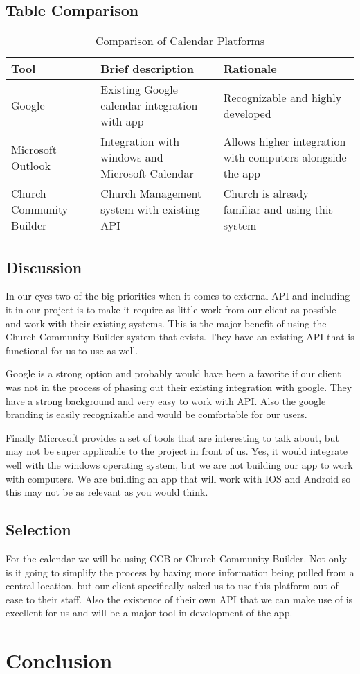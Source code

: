 \documentclass[letterpaper,10pt,draftclsnofoot,onecolumn,titlepage]{IEEEtran}
\begin{document}
	\subsection{Table Comparison}
	\begin{table}[ht]
	\caption{Comparison of Calendar Platforms}
	\begin{center}
	\begin{tabular} { | m{3cm} | m{5cm} | m{5cm} | }
	\hline\hline
	Tool & Brief description & Rationale \\ [0.5ex]
	\hline
	Google & Existing Google calendar integration with app & Recognizable and highly developed \\
	\hline
	Microsoft Outlook & Integration with windows and Microsoft Calendar & Allows higher integration with computers alongside the app \\
	\hline
	Church Community Builder & Church Management system with existing API & Church is already familiar and using this system \\
	\hline
	\end{tabular}
	\end{center}
	\end{table}
	\subsection{Discussion}
	In our eyes two of the big priorities when it comes to external API and including it in our project is to make it require as little work from our client as possible and work with their existing systems. This is the major benefit of using the Church Community Builder system that exists. They have an existing API that is functional for us to use as well.

	Google is a strong option and probably would have been a favorite if our client was not in the process of phasing out their existing integration with google. They have a strong background and very easy to work with API. Also the google branding is easily recognizable and would be comfortable for our users.

	Finally Microsoft provides a set of tools that are interesting to talk about, but may not be super applicable to the project in front of us. Yes, it would integrate well with the windows operating system, but we are not building our app to work with computers. We are building an app that will work with IOS and Android so this may not be as relevant as you would think.
	\subsection{Selection}
	For the calendar we will be using CCB or Church Community Builder. Not only is it going to simplify the process by having more information being pulled from a central location, but our client specifically asked us to use this platform out of ease to their staff. Also the existence of their own API that we can make use of is excellent for us and will be a major tool in development of the app.
	\clearpage
	\section{Conclusion}

	
	
\end{document}
